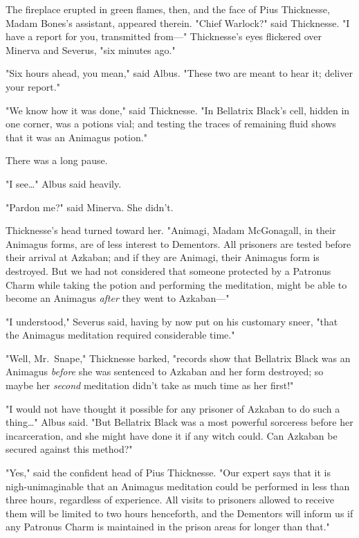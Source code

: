 The fireplace erupted in green flames, then, and the face of Pius Thicknesse, 
Madam Bones's assistant, appeared therein. "Chief Warlock?" said Thicknesse. "I 
have a report for you, transmitted from---" Thicknesse's eyes flickered over 
Minerva and Severus, "six minutes ago."

"Six hours ahead, you mean," said Albus. "These two are meant to hear it; 
deliver your report."

"We know how it was done," said Thicknesse. "In Bellatrix Black's cell, hidden 
in one corner, was a potions vial; and testing the traces of remaining fluid 
shows that it was an Animagus potion."

There was a long pause.

"I see{\ldots}" Albus said heavily.

"Pardon me?" said Minerva. She didn't.

Thicknesse's head turned toward her. "Animagi, Madam McGonagall, in their 
Animagus forms, are of less interest to Dementors. All prisoners are tested 
before their arrival at Azkaban; and if they are Animagi, their Animagus form 
is destroyed. But we had not considered that someone protected by a Patronus 
Charm while taking the potion and performing the meditation, might be able to 
become an Animagus \emph{after} they went to Azkaban---"

"I understood," Severus said, having by now put on his customary sneer, "that 
the Animagus meditation required considerable time."

"Well, Mr.~Snape," Thicknesse barked, "records show that Bellatrix Black was an 
Animagus \emph{before} she was sentenced to Azkaban and her form destroyed; so 
maybe her \emph{second} meditation didn't take as much time as her first!"

"I would not have thought it possible for any prisoner of Azkaban to do such a 
thing{\ldots}" Albus said. "But Bellatrix Black was a most powerful sorceress 
before her incarceration, and she might have done it if any witch could. Can 
Azkaban be secured against this method?"

"Yes," said the confident head of Pius Thicknesse. "Our expert says that it is 
nigh-unimaginable that an Animagus meditation could be performed in less than 
three hours, regardless of experience. All visits to prisoners allowed to 
receive them will be limited to two hours henceforth, and the Dementors will 
inform us if any Patronus Charm is maintained in the prison areas for longer 
than that."

